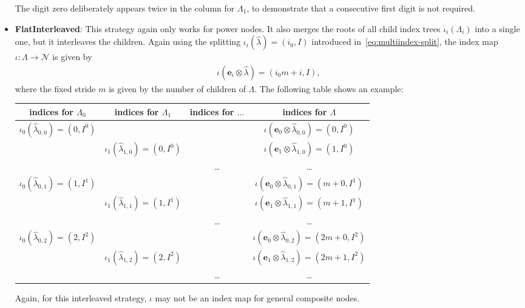 \documentclass[a4paper,10pt,headings=normal,bibliography=totoc]{scrartcl}
\begin{document}
\begin{itemize}
    The digit zero deliberately appears twice in the column for $\Lambda_1$, to demonstrate
    that a consecutive first digit is not required.

  \item \textbf{FlatInterleaved}: This strategy again only works for power nodes.
    It also merges
    the roots of all child index trees $\iota_i(\Lambda_i)$
    into a single one, but it interleaves the children.
    Again using the splitting
    $\iota_i(\hat{\lambda}) = (i_0,I)$ introduced in~\eqref{eq:multiindex-split},
    the index map $\iota:\Lambda \to \mathcal{N}$ is given by
    \begin{align*}
      \iota(\mathbf{e}_i \otimes\hat{\lambda}) = (i_0 m + i, I),
    \end{align*}
    where the fixed stride $m$ is given by the number of children of $\Lambda$.
    The following table shows an example:

    \begin{tabular}{c|c|c|c}
      indices for $\Lambda_0$ &
      indices for $\Lambda_1$ &
      indices for $\dots$ &
      indices for $\Lambda$ \\
      \hline
      $\iota_0(\hat{\lambda}_{0,0}) = (0,I^0)$ & & &
        $\iota(\mathbf{e}_0 \otimes \hat{\lambda}_{0,0}) = (0,I^0)$ \\
      & $\iota_1(\hat{\lambda}_{1,0}) = (0,I^0)$ & &
        $\iota(\mathbf{e}_1 \otimes \hat{\lambda}_{1,0}) = (1,I^0)$ \\
      & & \dots &
        \dots \\
      $\iota_0(\hat{\lambda}_{0,1}) = (1,I^1)$ & & &
        $\iota(\mathbf{e}_0 \otimes \hat{\lambda}_{0,1}) = (m+0,I^1)$ \\
      & $\iota_1(\hat{\lambda}_{1,1}) = (1,I^1)$ & &
        $\iota(\mathbf{e}_1 \otimes \hat{\lambda}_{1,1}) = (m+1,I^1)$ \\
      & & \dots &
        \dots \\
      $\iota_0(\hat{\lambda}_{0,2}) = (2,I^2)$ & & &
        $\iota(\mathbf{e}_0 \otimes \hat{\lambda}_{0,2}) = (2m+0,I^2)$ \\
      & $\iota_1(\hat{\lambda}_{1,2}) = (2,I^2)$ & &
        $\iota(\mathbf{e}_1 \otimes \hat{\lambda}_{1,2}) = (2m+1,I^2)$ \\
      & & \dots &
        \dots \\
    \end{tabular}

    Again, for this interleaved strategy, $\iota$ may not be an
    index map for general composite nodes.
\end{itemize}
\end{document}
